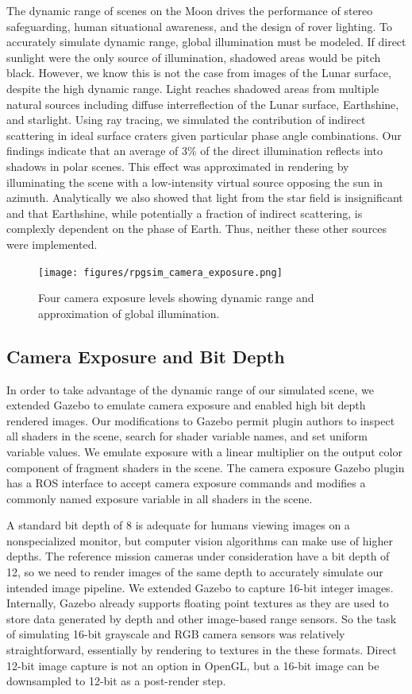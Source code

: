 \documentclass[twocolumn,letterpaper]{IEEEAerospaceCLS}  %
\begin{document}
The dynamic range of scenes on the Moon drives the performance of stereo safeguarding, human situational awareness, and the design of rover lighting. 
To accurately simulate dynamic range, global illumination must be modeled. 
If direct sunlight were the only source of illumination, shadowed areas would be pitch black. 
However, we know this is not the case from images of the Lunar surface, despite the high dynamic range. 
Light reaches shadowed areas from multiple natural sources including diffuse interreflection of the Lunar surface, Earthshine, and starlight. 
Using ray tracing, we simulated the contribution of indirect scattering in ideal surface craters given particular phase angle combinations. 
Our findings indicate that an average of 3\% of the direct illumination reflects into shadows in polar scenes. 
This effect was approximated in rendering by illuminating the scene with a low-intensity virtual source opposing the sun in azimuth. 
Analytically we also showed that light from the star field is insignificant and that Earthshine, while potentially a fraction of indirect scattering, is complexly dependent on the phase of Earth. 
Thus, neither these other sources were implemented.       

\begin{figure}[h!]
  \texttt{[image: figures/rpgsim\_camera\_exposure.png]}
  \caption{Four camera exposure levels showing dynamic range and approximation of global illumination. }
  \label{fig:cameraexposure}
\end{figure}

\subsection{Camera Exposure and Bit Depth}
In order to take advantage of the dynamic range of our simulated scene, we extended Gazebo to emulate camera exposure and enabled high bit depth rendered images. 
Our modifications to Gazebo permit plugin authors to inspect all shaders in the scene, search for shader variable names, and set uniform variable values. 
We emulate exposure with a linear multiplier on the output color component of fragment shaders in the scene. 
The camera exposure Gazebo plugin has a ROS interface to accept camera exposure commands and modifies a commonly named exposure  variable in all shaders in the scene. 

A standard bit depth of 8 is adequate for humans viewing images on a nonspecialized monitor, but computer vision algorithms can make use of higher depths. 
The reference mission cameras under consideration have a bit depth of 12, so we need to render images of the same depth to accurately simulate our intended image pipeline. 
We extended Gazebo to capture 16-bit integer images. 
Internally, Gazebo already supports floating point textures as they are used to store data generated by depth and other image-based range sensors. So the task of simulating 16-bit grayscale and RGB camera sensors was relatively straightforward, essentially by rendering to textures in the these formats. 
Direct 12-bit image capture is not an option in OpenGL, but a 16-bit image can be downsampled to 12-bit as a post-render step.
\end{document}
